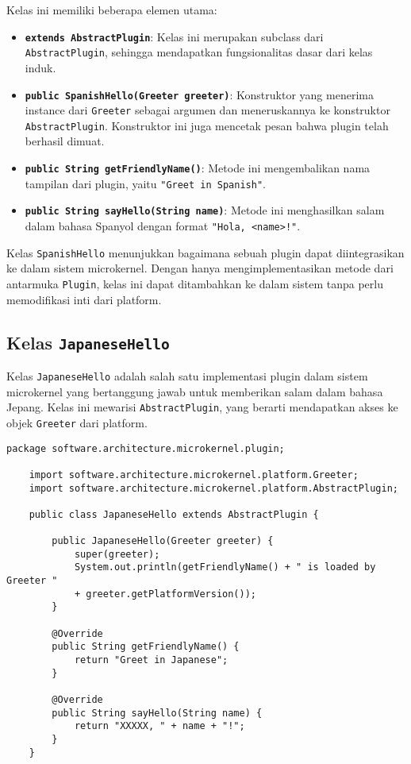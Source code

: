 \noindent
Kelas ini memiliki beberapa elemen utama:

\begin{itemize}
	\item \textbf{\texttt{extends AbstractPlugin}}: Kelas ini merupakan subclass dari \texttt{AbstractPlugin}, sehingga mendapatkan fungsionalitas dasar dari kelas induk.
	\item \textbf{\texttt{public SpanishHello(Greeter greeter)}}: Konstruktor yang menerima instance dari \texttt{Greeter} sebagai argumen dan meneruskannya ke konstruktor \texttt{AbstractPlugin}. Konstruktor ini juga mencetak pesan bahwa plugin telah berhasil dimuat.
	\item \textbf{\texttt{public String getFriendlyName()}}: Metode ini mengembalikan nama tampilan dari plugin, yaitu \texttt{"Greet in Spanish"}.
	\item \textbf{\texttt{public String sayHello(String name)}}: Metode ini menghasilkan salam dalam bahasa Spanyol dengan format \texttt{"Hola, <name>!"}.
\end{itemize}

Kelas \texttt{SpanishHello} menunjukkan bagaimana sebuah plugin dapat diintegrasikan ke dalam sistem microkernel. Dengan hanya mengimplementasikan metode dari antarmuka \texttt{Plugin}, kelas ini dapat ditambahkan ke dalam sistem tanpa perlu memodifikasi inti dari platform.

\subsection{Kelas \texttt{JapaneseHello}}

Kelas \texttt{JapaneseHello} adalah salah satu implementasi plugin dalam sistem microkernel yang bertanggung jawab untuk memberikan salam dalam bahasa Jepang. Kelas ini mewarisi \texttt{AbstractPlugin}, yang berarti mendapatkan akses ke objek \texttt{Greeter} dari platform.

\begin{lstlisting}[style=JavaStyle, caption={Kelas \texttt{JapaneseHello}}, label={lst:japanese-hello}, inputencoding=utf8]
	package software.architecture.microkernel.plugin;
	
	import software.architecture.microkernel.platform.Greeter;
	import software.architecture.microkernel.platform.AbstractPlugin;
	
	public class JapaneseHello extends AbstractPlugin {
		
		public JapaneseHello(Greeter greeter) {
			super(greeter);
			System.out.println(getFriendlyName() + " is loaded by Greeter " 
			+ greeter.getPlatformVersion());
		}
		
		@Override
		public String getFriendlyName() {
			return "Greet in Japanese";
		}
		
		@Override
		public String sayHello(String name) {
			return "XXXXX, " + name + "!";
		}
	}
\end{lstlisting}




